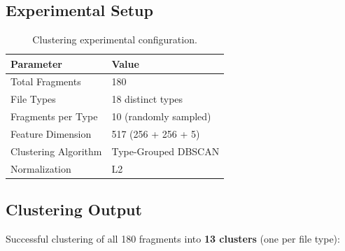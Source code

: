 \documentclass[12pt,a4paper]{report}
\begin{document}
\newpage
\chapter{}
\begin{normalsize}
\noindent

\section{Experimental Setup}
{\setlength{\baselineskip}{1.0\baselineskip}
\begin{table}[H]
\centering
\caption{Clustering experimental configuration.}
\label{tab:cluster_setup}
\begin{tabular}{ll}
\toprule
\textbf{Parameter} & \textbf{Value} \\
\midrule
Total Fragments & 180 \\
File Types & 18 distinct types \\
Fragments per Type & 10 (randomly sampled) \\
Feature Dimension & 517 (256 + 256 + 5) \\
Clustering Algorithm & Type-Grouped DBSCAN \\
Normalization & L2 \\
\bottomrule
\end{tabular}
\end{table}
\par}

\section{Clustering Output}
{\setlength{\baselineskip}{1.0\baselineskip}
Successful clustering of all 180 fragments into \textbf{13 clusters} (one per file type):

}
\end{normalsize}
\end{document}
